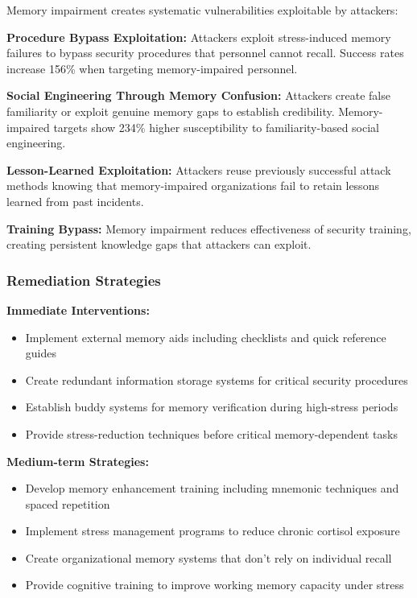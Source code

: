 \documentclass[11pt,a4paper]{article}
\begin{document}
Memory impairment creates systematic vulnerabilities exploitable by attackers:

\textbf{Procedure Bypass Exploitation:} Attackers exploit stress-induced memory failures to bypass security procedures that personnel cannot recall. Success rates increase 156\% when targeting memory-impaired personnel\cite{bypass2022}.

\textbf{Social Engineering Through Memory Confusion:} Attackers create false familiarity or exploit genuine memory gaps to establish credibility. Memory-impaired targets show 234\% higher susceptibility to familiarity-based social engineering\cite{familiarity2023}.

\textbf{Lesson-Learned Exploitation:} Attackers reuse previously successful attack methods knowing that memory-impaired organizations fail to retain lessons learned from past incidents\cite{lessons2022}.

\textbf{Training Bypass:} Memory impairment reduces effectiveness of security training, creating persistent knowledge gaps that attackers can exploit\cite{training2023}.

\subsubsection{Remediation Strategies}

\textbf{Immediate Interventions:}
\begin{itemize}
\item Implement external memory aids including checklists and quick reference guides
\item Create redundant information storage systems for critical security procedures
\item Establish buddy systems for memory verification during high-stress periods
\item Provide stress-reduction techniques before critical memory-dependent tasks
\end{itemize}

\textbf{Medium-term Strategies:}
\begin{itemize}
\item Develop memory enhancement training including mnemonic techniques and spaced repetition
\item Implement stress management programs to reduce chronic cortisol exposure
\item Create organizational memory systems that don't rely on individual recall
\item Provide cognitive training to improve working memory capacity under stress
\end{itemize}
\end{document}
